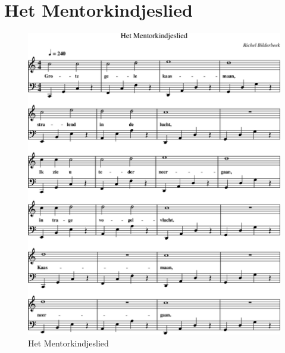 \chapter{Het Mentorkindjeslied}



\begin{figure}[!htbp]
  \includegraphics[width=\textwidth,height=\textheight,keepaspectratio]{../songs/16_het_mentorkindjeslied.png}
  \caption{Het Mentorkindjeslied}
  \label{fig:16_het_mentorkindjeslied}
\end{figure}
